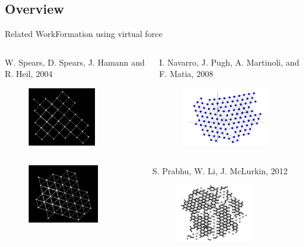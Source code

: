 \documentclass[10pt]{beamer}
\begin{document}
\subsection[Overview]{Overview}
\begin{frame}{Related Work}{Formation using virtual force}
   \begin{columns}[T] 
    \begin{column}{.45\textwidth}
      \scriptsize{W. Spears, D. Spears, J. Hamann and R. Heil, 2004}
      \begin{figure}
        \centering
        \includegraphics[height=1in]{figs/spears1.png}
      \end{figure}
    \end{column}%
    \begin{column}{.45\textwidth}
      \scriptsize{I. Navarro, J. Pugh, A. Martinoli, and
        F. Matia, 2008}
      \begin{figure}
        \centering
        \includegraphics[height=1in]{figs/navarro.png}
      \end{figure}      
    \end{column}
  \end{columns}
  \vspace{3mm}
  \begin{columns}[T] 
    \begin{column}{.45\textwidth}
      \begin{figure}
        \centering
        \includegraphics[height=1in]{figs/spears2.png}     
      \end{figure}  
    \end{column}%
    \begin{column}{.45\textwidth}
      \scriptsize{S. Prabhu, W. Li, J. McLurkin, 2012}
      \begin{figure}
        \centering
        \includegraphics[height=1in]{figs/james.png}
      \end{figure}
    \end{column}
  \end{columns}
\end{frame}
\end{document}
